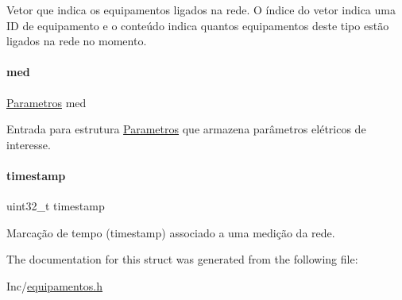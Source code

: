 Vetor que indica os equipamentos ligados na rede. O índice do vetor indica uma ID de equipamento e o conteúdo indica quantos equipamentos deste tipo estão ligados na rede no momento. \mbox{\label{struct_medicao_aa2e947ae4fcdfb65d9b7e1763b95fe4d}} 
\paragraph{\texorpdfstring{med}{med}}
{\footnotesize\ttfamily \hyperlink{struct_parametros}{Parametros} med}

Entrada para estrutura \hyperlink{struct_parametros}{Parametros} que armazena parâmetros elétricos de interesse. \mbox{\label{struct_medicao_ab20b0c7772544cf5d318507f34231fbe}} 
\paragraph{\texorpdfstring{timestamp}{timestamp}}
{\footnotesize\ttfamily uint32\+\_\+t timestamp}

Marcação de tempo (timestamp) associado a uma medição da rede. 

The documentation for this struct was generated from the following file\+:\begin{DoxyCompactItemize}
\item 
Inc/\hyperlink{equipamentos_8h}{equipamentos.\+h}\end{DoxyCompactItemize}
